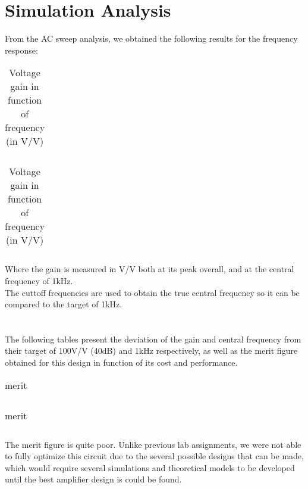 \section{Simulation Analysis}
\label{sec:simulation} 

From the AC sweep analysis, we obtained the following results for the frequency response:


\begin{table}[!htb]
  \parbox{.45\linewidth}{
    \centering
    \begin{tabular}{|l|l|}
      \hline
      
    \end{tabular}
    \caption{Lower and upper cutoff frequencies plus central frequency (in Hertz)}
  }
\hfill
  \parbox{0.45\linewidth}{
    \centering
    \begin{tabular}{|l|l|}
      \hline    
      
    \end{tabular}
    \caption{Voltage gain in function of frequency (in V/V)}
  }
\end{table}

Where the gain is measured in V/V both at its peak overall, and at the central frequency of 1kHz.\\
The cuttoff frequencies are used to obtain the true central frequency so it can be compared to the target of 1kHz.\\ \\ \\

The following tables present the deviation of the gain and central frequency from their target of 100V/V (40dB) and 1kHz respectively, as well as the merit figure obtained for this design in function of its cost and performance.
\begin{table}[!htb]
\parbox{.45\linewidth}{
\centering
\begin{tabular}{|l|l|}
    \hline    
    
  \end{tabular}
  \caption{deviations}
}
\hfill
\parbox{.45\linewidth}{
\centering
\begin{tabular}{|l|l|}
    \hline    
    
  \end{tabular}
  \caption{merit}
  \label{tab:Spice1}
}
\end{table}

The merit figure is quite poor. Unlike previous lab assignments, we were not able to fully optimize this circuit due to the several possible designs that can be made, which would require several simulations and theoretical models to be developed until the best amplifier design is could be found.\\ \\ \\

